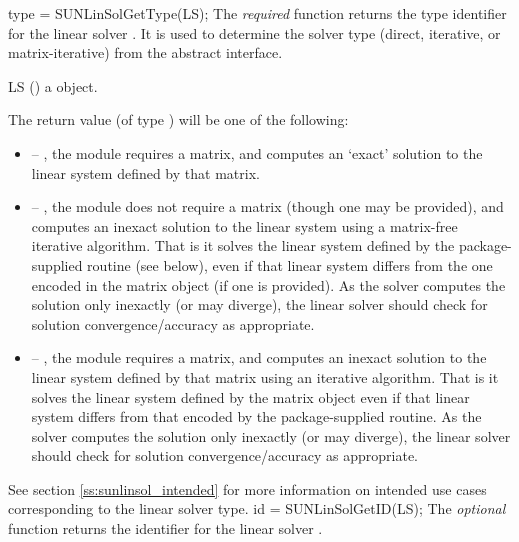 {
  type = SUNLinSolGetType(LS);
}
{
  The \textit{required} function  returns the
  type identifier for the linear solver . It is used to
  determine the solver type (direct, iterative, or matrix-iterative) from
  the abstract  interface.
}
{
  \begin{args}[LS]
  \item[LS] ()
    a {\sunlinsol} object.
  \end{args}
}
{
  The return value  (of type ) will be one of the
  following:
  \begin{itemize}
  \item {} -- , the {\sunlinsol} module requires
  a matrix, and computes an `exact' solution to the linear system defined by
  that matrix.
  \item {} -- , the {\sunlinsol} module does
  not require a matrix (though one may be provided), and computes an inexact
  solution to the linear system using a matrix-free iterative algorithm. That is
  it solves the linear system defined by the package-supplied 
  routine (see  below), even if that linear
  system differs from the one encoded in the matrix object (if one is
  provided). As the solver computes the solution only inexactly (or may
  diverge), the linear solver should check for solution convergence/accuracy as
  appropriate. 
  \item {} -- , the {\sunlinsol}
  module requires a matrix, and computes an inexact solution to the linear
  system defined by that matrix using an iterative algorithm. That is it solves
  the linear system defined by the matrix object even if that linear system
  differs from that encoded by the package-supplied  routine. As the
  solver computes the solution only inexactly (or may diverge), the linear
  solver should check for solution convergence/accuracy as appropriate.
  \end{itemize}
}
{
 See section \ref{ss:sunlinsol_intended} for more information on intended use
 cases corresponding to the linear solver type.
}
{
  id = SUNLinSolGetID(LS);
}
{
  The \textit{optional} function  returns the
  identifier for the linear solver .
}
